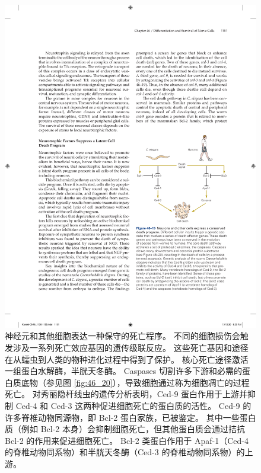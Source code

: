 \begin{figure}[htbp]
	\centering
	\includegraphics[width=0.9\linewidth]{chap46/fig_46_19}
	\caption{神经元和其他细胞表达一种保守的死亡程序。 不同的细胞损伤会触发涉及一系列死亡效应基因的遗传级联反应。 这些死亡基因和途径在从蠕虫到人类的物种进化过程中得到了保护。 核心死亡途径激活一组蛋白水解酶，半胱天冬酶。 Caspases 切割许多下游和必需的蛋白质底物（参见图 \ref{fig:46_20}），导致细胞通过称为细胞凋亡的过程死亡。 对秀丽隐杆线虫的遗传分析表明，Ced-9 蛋白作用于上游并抑制 Ced-4 和 Ced-3 这两种促进细胞死亡的蛋白质的活性。 Ced-9 的许多脊椎动物同源物，即 Bcl-2 蛋白家族，已被鉴定。 其中一些蛋白质（例如 Bcl-2 本身）会抑制细胞死亡，但其他蛋白质会通过拮抗 Bcl-2 的作用来促进细胞死亡。 Bcl-2 类蛋白作用于 Apaf-1（Ced-4 的脊椎动物同系物）和半胱天冬酶（Ced-3 的脊椎动物同系物）的上游。}
	\label{fig:46_19}
\end{figure}


